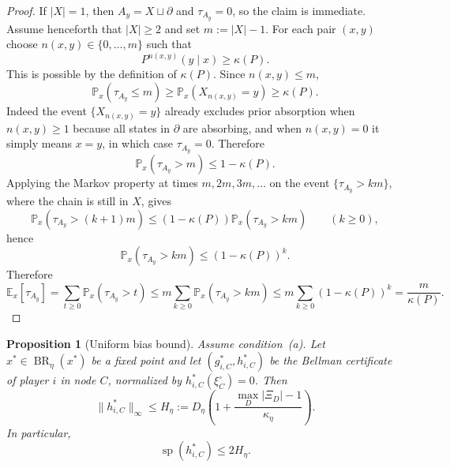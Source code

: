 \documentclass[12pt]{article}
\newtheorem{proposition}[theorem]{Proposition}
\theoremstyle{definition}
\newcommand{\E}{\mathbb{E}}
\newcommand{\Pb}{\mathbb{P}}
\newcommand{\1}{\mathbf{1}}
\DeclareMathOperator{\spn}{sp}
\DeclareMathOperator{\BR}{BR}
\begin{document}
\begin{proof}
If $|X|=1$, then $A_y=X\sqcup\partial$ and $\tau_{A_y}=0$, so the claim is
immediate. Assume henceforth that $|X|\ge 2$ and set $m:=|X|-1$. For each pair
$(x,y)$ choose
$n(x,y)\in\{0,\dots,m\}$ such that
\[
P^{n(x,y)}(y\mid x)\ge \kappa(P).
\]
This is possible by the definition of $\kappa(P)$. Since $n(x,y)\le m$,
\[
\Pb_x(\tau_{A_y}\le m)\ge \Pb_x(X_{n(x,y)}=y)\ge \kappa(P).
\]
Indeed the event $\{X_{n(x,y)}=y\}$ already excludes prior absorption when
$n(x,y)\ge 1$ because all states in $\partial$ are absorbing, and when
$n(x,y)=0$ it simply means $x=y$, in which case $\tau_{A_y}=0$. Therefore
\[
\Pb_x(\tau_{A_y}>m)\le 1-\kappa(P).
\]
Applying the Markov property at times $m,2m,3m,\dots$ on the event
$\{\tau_{A_y}>km\}$, where the chain is still in $X$, gives
\[
\Pb_x(\tau_{A_y}>(k+1)m)\le (1-\kappa(P))\Pb_x(\tau_{A_y}>km)
\qquad (k\ge 0),
\]
hence
\[
\Pb_x(\tau_{A_y}>km)\le (1-\kappa(P))^k.
\]
Therefore
\[
\E_x[\tau_{A_y}]
=
\sum_{t\ge 0}\Pb_x(\tau_{A_y}>t)
\le
m\sum_{k\ge 0}\Pb_x(\tau_{A_y}>km)
\le
m\sum_{k\ge 0}(1-\kappa(P))^k
=
\frac{m}{\kappa(P)}.
\]
\end{proof}


\begin{proposition}[Uniform bias bound]
\label{prop:bias-span}
Assume condition~\textnormal{(a)}. Let $x^*\in\BR_\eta(x^*)$ be a fixed point and
let $(g_{i,C}^*,h_{i,C}^*)$ be the Bellman certificate of player $i$ in node $C$,
normalized by $h_{i,C}^*(\xi_C^\circ)=0$. Then
\[
\|h_{i,C}^*\|_\infty\le
H_\eta:=D_\eta\left(1+\frac{\max_D|\Xi_D|-1}{\kappa_\eta}\right).
\]
In particular,
\[
\spn(h_{i,C}^*)\le 2H_\eta.
\]
\end{proposition}
\end{document}
